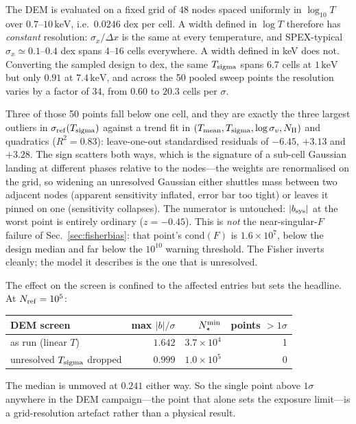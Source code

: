 \documentclass[11pt,a4paper]{article}
\newcommand{\nh}{N_{\mathrm{H}}}
\newcommand{\kev}{\,\mathrm{keV}}
\begin{document}
The DEM is evaluated on a fixed grid of $48$ nodes spaced uniformly in
$\log_{10}T$ over $0.7$--$10\kev$, i.e.\ $0.0246$ dex per cell. A width defined
in $\log T$ therefore has \emph{constant} resolution: $\sigma_x/\Delta x$ is the
same at every temperature, and SPEX-typical $\sigma_x\simeq0.1$--$0.4$ dex spans
$4$--$16$ cells everywhere. A width defined in keV does not. Converting the
sampled design to dex, the same $T_{\rm sigma}$ spans $6.7$ cells at
$1\kev$ but only $0.91$ at $7.4\kev$, and across the 50 pooled sweep points the
resolution varies by a factor of $34$, from $0.60$ to $20.3$ cells per $\sigma$.

Three of those 50 points fall below one cell, and they are exactly the three
largest outliers in $\sigma_{\rm ref}(T_{\rm sigma})$ against a trend fit in
$(T_{\rm mean}, T_{\rm sigma}, \log\sigma_v, \nh)$ and quadratics
($R^2=0.83$): leave-one-out standardised residuals of $-6.45$, $+3.13$ and
$+3.28$. The sign scatters both ways, which is the signature of a sub-cell
Gaussian landing at different phases relative to the nodes---the weights are
renormalised on the grid, so widening an unresolved Gaussian either shuttles
mass between two adjacent nodes (apparent sensitivity inflated, error bar too
tight) or leaves it pinned on one (sensitivity collapses). The numerator is
untouched: $|b_{\rm sys}|$ at the worst point is entirely ordinary ($z=-0.45$).
This is \emph{not} the near-singular-$F$ failure of Sec.~\ref{sec:fisherbias}:
that point's $\mathrm{cond}(F)$ is $1.6\times10^7$, below the design median and
far below the $10^{10}$ warning threshold. The Fisher inverts cleanly; the
model it describes is the one that is unresolved.

The effect on the screen is confined to the affected entries but sets the
headline. At $N_{\rm ref}=10^5$:
\begin{center}
\begin{tabular}{lrrr}
\toprule
DEM screen & max $|b|/\sigma$ & $N_\star^{\rm min}$ & points $>1\sigma$ \\
\midrule
as run (linear $T$)               & $1.642$ & $3.7\times10^{4}$ & 1 \\
unresolved $T_{\rm sigma}$ dropped & $0.999$ & $1.0\times10^{5}$ & 0 \\
\bottomrule
\end{tabular}
\end{center}
The median is unmoved at $0.241$ either way. So the single point above
$1\sigma$ anywhere in the DEM campaign---the point that alone sets the exposure
limit---is a grid-resolution artefact rather than a physical result.
\end{document}
